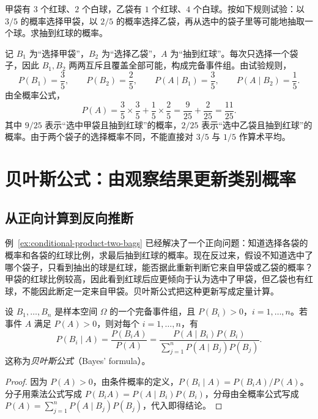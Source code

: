 \documentclass[UTF8,12pt,a4paper,fontset=fandol]{ctexart}
\begin{document}
\begin{example}[从各袋红球比例求总体红球概率]
\label{ex:conditional-product-two-bags}
甲袋有 $3$ 个红球、$2$ 个白球，乙袋有 $1$ 个红球、$4$ 个白球。按如下规则试验：以 $3/5$ 的概率选择甲袋，以 $2/5$ 的概率选择乙袋，再从选中的袋子里等可能地抽取一个球。求抽到红球的概率。
\end{example}
\begin{solve}
记 $B_1$ 为“选择甲袋”，$B_2$ 为“选择乙袋”，$A$ 为“抽到红球”。每次只选择一个袋子，因此 $B_1,B_2$ 两两互斥且覆盖全部可能，构成完备事件组。由试验规则，
\[
  P(B_1)=\frac35,\qquad P(B_2)=\frac25,
  \qquad
  P(A\mid B_1)=\frac35,\qquad P(A\mid B_2)=\frac15.
\]
由全概率公式，
\begin{equation}
  P(A)=\frac35\times\frac35+\frac15\times\frac25
      =\frac9{25}+\frac2{25}
      =\frac{11}{25}.
  \label{eq:conditional-product-two-bags-total}
\end{equation}
其中 $9/25$ 表示“选中甲袋且抽到红球”的概率，$2/25$ 表示“选中乙袋且抽到红球”的概率。由于两个袋子的选择概率不同，不能直接对 $3/5$ 与 $1/5$ 作算术平均。
\end{solve}

\section{贝叶斯公式：由观察结果更新类别概率}
\label{sec:conditional-product-bayes}

\subsection{从正向计算到反向推断}

例~\ref{ex:conditional-product-two-bags} 已经解决了一个正向问题：知道选择各袋的概率和各袋的红球比例，求最后抽到红球的概率。现在反过来，假设不知道选中了哪个袋子，只看到抽出的球是红球，能否据此重新判断它来自甲袋或乙袋的概率？甲袋的红球比例较高，因此看到红球后应更倾向于认为选中了甲袋，但乙袋也有红球，不能因此断定一定来自甲袋。贝叶斯公式把这种更新写成定量计算。

\begin{theorem}[贝叶斯公式]
\label{thm:conditional-product-bayes}
设 $B_1,\ldots,B_n$ 是样本空间 $\Omega$ 的一个完备事件组，且 $P(B_i)>0$，$i=1,\ldots,n$。若事件 $A$ 满足 $P(A)>0$，则对每个 $i=1,\ldots,n$，有
\begin{equation}
  P(B_i\mid A)
  =\frac{P(B_iA)}{P(A)}
  =\frac{P(A\mid B_i)P(B_i)}
         {\displaystyle\sum_{j=1}^{n}P(A\mid B_j)P(B_j)}.
  \label{eq:conditional-product-bayes}
\end{equation}
这称为\emph{贝叶斯公式}（Bayes' formula）。
\end{theorem}
\begin{proof}
因为 $P(A)>0$，由条件概率的定义，$P(B_i\mid A)=P(B_iA)/P(A)$。分子用乘法公式写成 $P(B_iA)=P(A\mid B_i)P(B_i)$，分母由全概率公式写成 $P(A)=\sum_{j=1}^{n}P(A\mid B_j)P(B_j)$，代入即得结论。
\end{proof}
\end{document}
